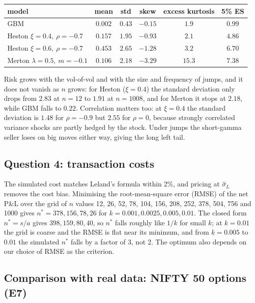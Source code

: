 \documentclass[11pt,a4paper]{article}
\begin{document}
\begin{center}\small
\begin{tabular}{lccccc}
\toprule
model & mean & std & skew & excess kurtosis & 5\% ES \\
\midrule
GBM                                  & $0.002$ & $0.43$ & $-0.15$ & $1.9$  & $0.99$ \\
Heston $\xi=0.4,\ \rho=-0.7$          & $0.157$ & $1.95$ & $-0.93$ & $2.1$  & $4.86$ \\
Heston $\xi=0.6,\ \rho=-0.7$          & $0.453$ & $2.65$ & $-1.28$ & $3.2$  & $6.70$ \\
Merton $\lambda=0.5,\ m=-0.1$         & $0.106$ & $2.18$ & $-3.29$ & $15.3$ & $7.38$ \\
\bottomrule
\end{tabular}
\end{center}

Risk grows with the vol-of-vol and with the size and frequency of jumps, and it does not vanish as $n$ grows: for Heston ($\xi=0.4$) the standard deviation only drops from $2.83$ at $n=12$ to $1.91$ at $n=1008$, and for Merton it stops at $2.18$, while GBM falls to $0.22$. Correlation matters too: at $\xi=0.4$ the standard deviation is $1.48$ for $\rho=-0.9$ but $2.55$ for $\rho=0$, because strongly correlated variance shocks are partly hedged by the stock. Under jumps the short-gamma seller loses on big moves either way, giving the long left tail.

\subsection{Question 4: transaction costs}

The simulated cost matches Leland's formula within 2\%, and pricing at $\hat\sigma_L$ removes the cost bias. Minimising the root-mean-square error (RMSE) of the net P\&L over the grid of $n$ values 12, 26, 52, 78, 104, 156, 208, 252, 378, 504, 756 and 1000 gives $n^*=378,156,78,26$ for $k=0.001,0.0025,0.005,0.01$. The closed form $n^*=s/a$ gives $398,159,80,40$, so $n^*$ falls roughly like $1/k$ for small $k$; at $k=0.01$ the grid is coarse and the RMSE is flat near its minimum, and from $k=0.005$ to $0.01$ the simulated $n^*$ falls by a factor of 3, not 2. The optimum also depends on our choice of RMSE as the criterion.


\subsection{Comparison with real data: NIFTY 50 options (E7)}
\end{document}
